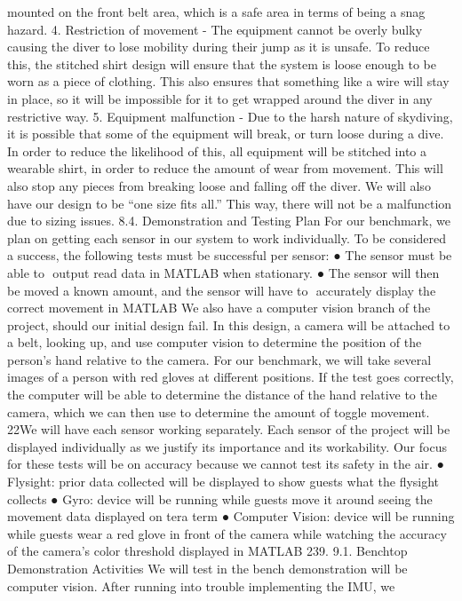 mounted on the front belt area, which is a safe area in terms of being a snag hazard.
4. Restriction of movement​ - The equipment cannot be overly bulky causing the diver to lose mobility during their
jump as it is unsafe. To reduce this, the stitched shirt design will ensure that the system is loose enough to be
worn as a piece of clothing. This also ensures that something like a wire will stay in place, so it will be impossible
for it to get wrapped around the diver in any restrictive way.
5. Equipment malfunction​ - Due to the harsh nature of skydiving, it is possible that some of the equipment will
break, or turn loose during a dive. In order to reduce the likelihood of this, all equipment will be stitched into a
wearable shirt, in order to reduce the amount of wear from movement. This will also stop any pieces from
breaking loose and falling off the diver. We will also have our design to be “one size fits all.” This way, there will
not be a malfunction due to sizing issues.
8.4.
Demonstration and Testing Plan
For our benchmark, we plan on getting each sensor in our system to work individually. To be considered a success, the
following tests must be successful per sensor:
● The sensor must be able to ​ output read data​ in MATLAB when stationary.
● The sensor will then be moved a known amount, and the sensor will have to ​ accurately display​ the correct
movement in MATLAB
We also have a computer vision branch of the project, should our initial design fail. In this design, a camera will be
attached to a belt, looking up, and use computer vision to determine the position of the person’s hand relative to the
camera. For our benchmark, we will take several images of a person with red gloves at different positions. If the test
goes correctly, the computer will be able to determine the distance of the hand relative to the camera, which we can
then use to determine the amount of toggle movement.
22We will have each sensor working separately. Each sensor of the project will be displayed individually as we justify its
importance and its workability. Our focus for these tests will be on accuracy because we cannot test its safety in the air.
● Flysight: prior data collected will be displayed to show guests what the flysight collects
● Gyro: device will be running while guests move it around seeing the movement data displayed on tera term
● Computer Vision: device will be running while guests wear a red glove in front of the camera while watching the
accuracy of the camera’s color threshold displayed in MATLAB
239.
9.1.
Benchtop Demonstration
Activities
We will test in the bench demonstration will be computer vision. After running into trouble implementing the IMU, we
